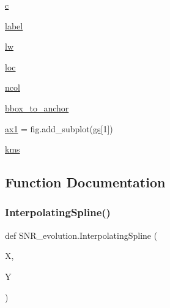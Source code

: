 \begin{DoxyCompactItemize}
\item 
\hyperlink{namespaceSNR__evolution_a0f384e8972ecbf3b63f448f47f736676}{c}
\item 
\hyperlink{namespaceSNR__evolution_ae3a47858b8786e1fa2bc21e67042c9c8}{label}
\item 
\hyperlink{namespaceSNR__evolution_aecb802cc57c3442e9cfa16414ed54cde}{lw}
\item 
\hyperlink{namespaceSNR__evolution_a516ca870e946f64a2f57b9570c4e56fe}{loc}
\item 
\hyperlink{namespaceSNR__evolution_a9c9014256014b6f257a7ca48928dc5fc}{ncol}
\item 
\hyperlink{namespaceSNR__evolution_a13500afe942a4e9d174412aed0c8a844}{bbox\+\_\+to\+\_\+anchor}
\item 
\hyperlink{namespaceSNR__evolution_af23a13b8429df186c22aa352da6983ec}{ax1} = fig.\+add\+\_\+subplot(\hyperlink{namespaceSNR__evolution_a7c849cab581a2471a15771cfab7a0f6c}{gs}\mbox{[}1\mbox{]})
\item 
\hyperlink{namespaceSNR__evolution_ad025ed64eb70952d02f2615f98ced9a1}{kms}
\end{DoxyCompactItemize}


\subsection{Function Documentation}
\mbox{\label{namespaceSNR__evolution_a2ce2af757e103b1693310fe9e68806c0}} 
\subsubsection{\texorpdfstring{Interpolating\+Spline()}{InterpolatingSpline()}}
{\footnotesize\ttfamily def S\+N\+R\+\_\+evolution.\+Interpolating\+Spline (\begin{DoxyParamCaption}\item[{}]{X,  }\item[{}]{Y }\end{DoxyParamCaption})}

\mbox{\label{namespaceSNR__evolution_a4eff759f9aa4a1e06b487c1223377390}} 
